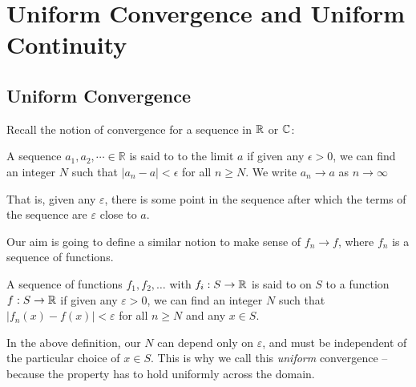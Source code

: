 \documentclass[a4paper]{scrartcl}
\begin{document}




\section{Uniform Convergence and Uniform Continuity} 

\subsection{Uniform Convergence}
Recall the notion of convergence for a sequence in $\mathbb{R}$ or $\mathbb{C}$:

\begin{definition}
    A sequence $a_{1}, a_{2}, \cdots \in \mathbb{R}$ is said to  to the limit $a$ if given any $\epsilon>0$, we can find an integer $N$ such that $\left|a_{n}-a\right|<\epsilon$ for all $n \geq N$. We write $a_{n} \rightarrow a$ as $n \rightarrow \infty$
\end{definition}

That is, given any $\varepsilon$, there is some point in the sequence after which the terms of the sequence are $\varepsilon$ close to $a$. 

Our aim is going to define a similar notion to make sense of $f_n \rightarrow f$, where $f_n$ is a sequence of functions.

\begin{definition}
    A sequence of functions $f_1, f_2, \dots$ with $f_i : S \rightarrow \mathbb{R}$ is said to  on $S$ to a function $f:S \rightarrow \mathbb{R}$ if given any $\varepsilon > 0$, we can find an integer $N$ such that $|f_n(x) - f(x)| < \varepsilon$ for all $n \geq N$ and any $x \in S$.
\end{definition}

\begin{remark}
    In the above definition, our $N$ can depend only on $\varepsilon$, and must be independent of the particular choice of $x \in S$. This is why we call this \emph{uniform} convergence -- because the property has to hold uniformly across the domain. 
\end{remark}
\end{document}
